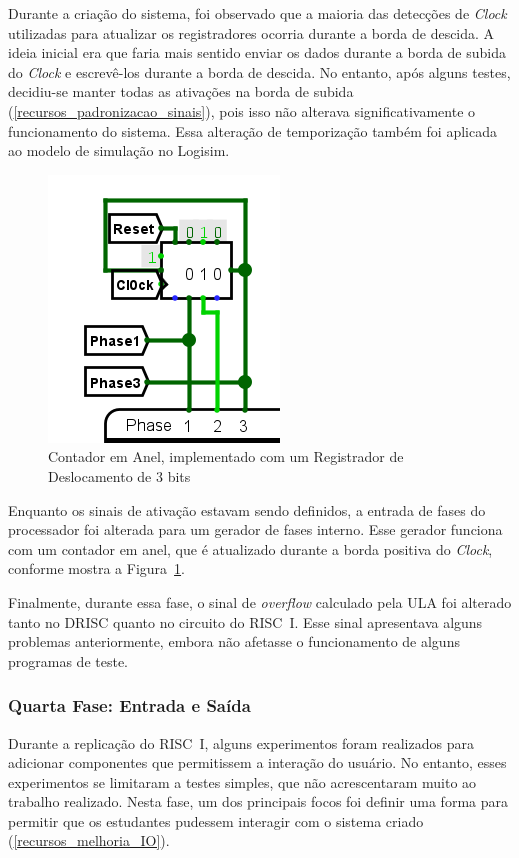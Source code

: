 \documentclass[
	12pt,				%
	openright,			%
	oneside,			%
	a4paper,			%
	english,			%
	french,				%
	spanish,			%
	brazil,				%
	]{abntex2}
\begin{document}
Durante a criação do sistema, foi observado que a maioria das detecções de \textit{Clock} utilizadas para atualizar os registradores ocorria durante a borda de descida. A ideia inicial era que faria mais sentido enviar os dados durante a borda de subida do \textit{Clock} e escrevê-los durante a borda de descida. No entanto, após alguns testes, decidiu-se manter todas as ativações na borda de subida (\ref{recursos_padronizacao_sinais}), pois isso não alterava significativamente o funcionamento do sistema. Essa alteração de temporização também foi aplicada ao modelo de simulação no Logisim.

\begin{figure}[H]
    \centering
    \includegraphics[width=0.25\linewidth]{ProcessoDesenvolvimento/Arquitetura/ContAnel.png}
    \caption{Contador em Anel, implementado com um Registrador de Deslocamento de 3 bits}
    \label{fig:cont_anel}
\end{figure}

Enquanto os sinais de ativação estavam sendo definidos, a entrada de fases do processador foi alterada para um gerador de fases interno. Esse gerador funciona com um contador em anel, que é atualizado durante a borda positiva do \textit{Clock}, conforme mostra a Figura~\ref{fig:cont_anel}.

Finalmente, durante essa fase, o sinal de \textit{overflow} calculado pela ULA foi alterado tanto no DRISC quanto no circuito do RISC~I. Esse sinal apresentava alguns problemas anteriormente, embora não afetasse o funcionamento de alguns programas de teste.

\subsubsection{Quarta Fase: Entrada e Saída}

Durante a replicação do RISC~I, alguns experimentos foram realizados para adicionar componentes que permitissem a interação do usuário. No entanto, esses experimentos se limitaram a testes simples, que não acrescentaram muito ao trabalho realizado. Nesta fase, um dos principais focos foi definir uma forma para permitir que os estudantes pudessem interagir com o sistema criado (\ref{recursos_melhoria_IO}).
\end{document}
